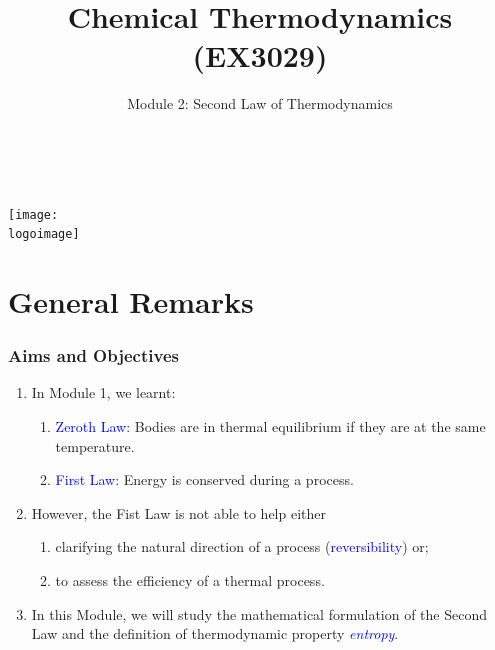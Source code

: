 \documentclass[10pt,compress]{beamer}
\institute{School of Engineering}
\title{Chemical Thermodynamics (EX3029)}
\subtitle{Module 2: Second Law of Thermodynamics}
\date[ ]{ }
\author[\shortname]{%
  \fullname\\\ttfamily{\emailaddress}
}
\newcommand{\logoimage}{../../FigBanner/UoAHorizBanner}
\begin{document}
\begin{frame}
  \titlepage
  \vfill%
  \begin{center}
    \texttt{[image: \\logoimage]}
  \end{center}
\end{frame}






\section{General Remarks}

\begin{frame}
 \frametitle{Aims and Objectives}
   \begin{enumerate}
     \item<1-> In Module 1, we learnt:
       \begin{enumerate}
         \item<1-> \textcolor{blue}{Zeroth Law:} Bodies are in thermal equilibrium if they are at the same temperature.
         \item<1-> \textcolor{blue}{First Law:} Energy is conserved during a process.
       \end{enumerate} 
     \item<2-> However, the Fist Law is not able to help either 
       \begin{enumerate}
         \item<2-> clarifying the natural direction of a process (\textcolor{blue}{reversibility}) or;
         \item<2-> to assess the efficiency of a thermal process.
       \end{enumerate}
     \item<3-> In this Module, we will study the mathematical formulation of the Second Law and the definition of thermodynamic property \textcolor{blue}{\it entropy}.
   \end{enumerate}

\end{frame}
\end{document}
